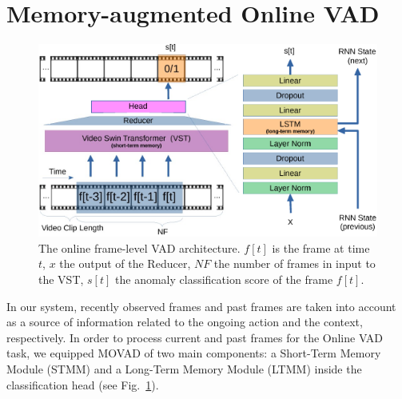 \section{Memory-augmented Online VAD}
\label{sec:theory}

\fboxsep=1mm%
\fboxrule=1pt%

\begin{figure}[!t]
            \centerline{\includegraphics[clip, width=\linewidth]{images/arch-rx-cropped.pdf}}
        \caption{The online frame-level VAD architecture. $f[t]$ is the frame at time $t$, $x$ the output of the Reducer, $\mathit{NF}$ the number of frames in input to the VST, $s[t]$ the anomaly classification score of the frame $f[t]$.\label{fig:arch}}
\end{figure}

In our system, recently observed frames and past frames are taken into account as a source of information related to the ongoing action and the context, respectively.
In order to process current and past frames for the Online VAD task, we equipped MOVAD of two main components: a Short-Term Memory Module (STMM) and a Long-Term Memory Module (LTMM) inside the classification head (see Fig.~\ref{fig:arch}). 

